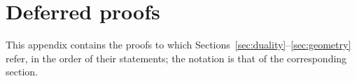 \section{Deferred proofs}\label{app:deferred}

This appendix contains the proofs to which Sections~\ref{sec:duality}--\ref{sec:geometry} refer, in the order of
their statements; the notation is that of the corresponding section.
